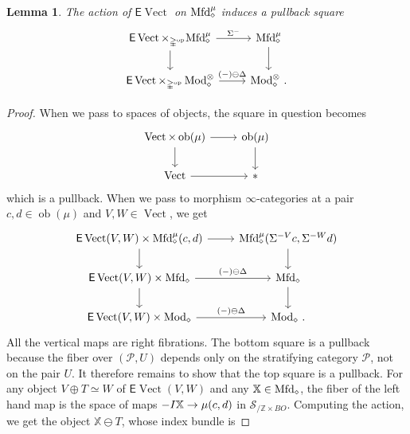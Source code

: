 \documentclass[10pt]{amsart}
\numberwithin{equation}{section}
\newtheorem{lem}[prop]{Lemma}
\theoremstyle{definition}
\DeclareMathOperator{\Mod}{Mod}
\DeclareMathOperator{\ob}{ob}
\DeclareMathOperator{\op}{op}
\DeclareMathOperator{\Vect}{Vect}
\newcommand{\Mfd}{\mathrm{Mfd}\vphantom{d}}
\newcommand{\bZ}{\mathbb{Z}}
\newcommand{\bX}{\mathbb{X}}
\newcommand{\Simp}{\mathbb{\Delta}}
\newcommand{\cP}{\mathcal{P}}
\newcommand{\cS}{\mathcal{S}}
\newcommand{\sfE}{\mathsf{E}}
\renewcommand{\to}{\mathchoice{\longrightarrow}{\rightarrow}{}{}}
\begin{document}
\begin{lem}\label{lem:EVect_act_inv}
	The action of $\sfE \Vect$ on $\Mfd_{\diamond}^{\mu}$ induces a pullback square
	\begin{equation}\label{eq:EVect_acts_invertably}
		\begin{tikzcd}
			\sfE \Vect \times_{\Simp^{\op}} \Mfd_{\diamond}^{\mu} \arrow[r, "\Sigma^{-}"] \arrow[d]      &   \Mfd^{\mu}_{\diamond}  \arrow[d] \\
			\sfE\Vect \times_{\Simp^{\op}}\Mod_{\diamond}^{\otimes}  \arrow[r, "(-)\ominus \Delta"]               & \Mod^{\otimes}_{\diamond} \,.
		\end{tikzcd}
	\end{equation}
\end{lem}
\begin{proof}
	When we pass to spaces of objects, the square in question becomes
	\begin{equation*}
		\begin{tikzcd}
			\Vect \times \ob(\mu) \arrow[r] \arrow[d]      &   \ob(\mu)  \arrow[d] \\
			\Vect  \arrow[r]               &   \ast
		\end{tikzcd}
	\end{equation*}
	which is a pullback.
  When we pass to morphism $\infty$-categories at a pair $c,d\in \ob(\mu)$ and $V,W\in \Vect$, we get
	\begin{equation*}
		\begin{tikzcd}
			\sfE\Vect(V,W) \times \Mfd_{\diamond}^{\mu}(c,d) \arrow[r] \arrow[d]      &   \Mfd_{\diamond}^{\mu}(\Sigma^{-V}c, \Sigma^{-W}d)   \arrow[d] \\
			\sfE\Vect(V,W)\times \Mfd_{\diamond}  \arrow[r, "(-)\ominus \Delta"]  \arrow[d]             &  \Mfd_{\diamond} \arrow[d] \\
			\sfE\Vect(V,W) \times \Mod_{\diamond} \arrow[r, "(-)\ominus \Delta"] & \Mod_{\diamond} \,.
		\end{tikzcd}
	\end{equation*}
	All the vertical maps are right fibrations.
  The bottom square is a pullback because the fiber over $(\cP,U)$ depends only on the stratifying category $\cP$, not on the pair $U$.
  It therefore remains to show that the top square is a pullback.
  For any object $V\oplus T \simeq W$ of $\sfE\Vect(V,W)$ and any $\bX\in \Mfd_{\diamond}$, the fiber of the left hand map is the space of maps $-I\bX \to \mu(c,d)$ in $\cS_{/ \bZ\times BO}$.
  Computing the action, we get the object $\bX\ominus T$, whose index bundle is

\end{proof}
\end{document}
